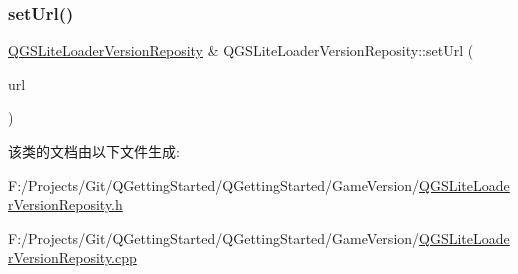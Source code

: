 \mbox{\label{class_q_g_s_lite_loader_version_reposity_a4d12b6457ac6026f0511268bd1b97c6c}} 
\subsubsection{\texorpdfstring{set\+Url()}{setUrl()}}
{\footnotesize\ttfamily \mbox{\hyperlink{class_q_g_s_lite_loader_version_reposity}{Q\+G\+S\+Lite\+Loader\+Version\+Reposity}} \& Q\+G\+S\+Lite\+Loader\+Version\+Reposity\+::set\+Url (\begin{DoxyParamCaption}\item[{const Q\+Url \&}]{url }\end{DoxyParamCaption})}



该类的文档由以下文件生成\+:\begin{DoxyCompactItemize}
\item 
F\+:/\+Projects/\+Git/\+Q\+Getting\+Started/\+Q\+Getting\+Started/\+Game\+Version/\mbox{\hyperlink{_q_g_s_lite_loader_version_reposity_8h}{Q\+G\+S\+Lite\+Loader\+Version\+Reposity.\+h}}\item 
F\+:/\+Projects/\+Git/\+Q\+Getting\+Started/\+Q\+Getting\+Started/\+Game\+Version/\mbox{\hyperlink{_q_g_s_lite_loader_version_reposity_8cpp}{Q\+G\+S\+Lite\+Loader\+Version\+Reposity.\+cpp}}\end{DoxyCompactItemize}
